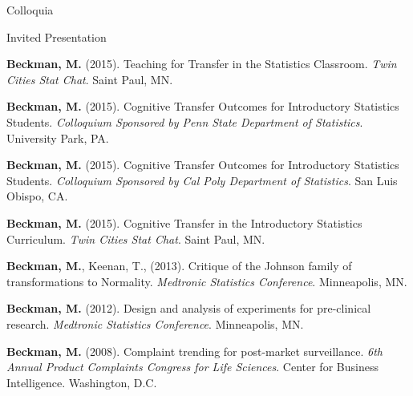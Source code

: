 \documentclass{resume} %
\begin{document}

\begin{rSection}{Colloquia}
	

	\begin{rSubsection}{Invited Presentation}{}{}{}
		
		\item[] \textbf{Beckman, M.} (2015). Teaching for Transfer in the Statistics Classroom. \textit{Twin Cities Stat Chat}. Saint Paul, MN. \vspace{0.5em}

		\item[] \textbf{Beckman, M.} (2015). Cognitive Transfer Outcomes for Introductory Statistics Students. \textit{Colloquium Sponsored by Penn State Department of Statistics}. University Park, PA. \vspace{0.5em}
		
		\item[] \textbf{Beckman, M.} (2015). Cognitive Transfer Outcomes for Introductory Statistics Students. \textit{Colloquium Sponsored by Cal Poly Department of Statistics}. San Luis Obispo, CA. \vspace{0.5em}		
		
		\item[] \textbf{Beckman, M.} (2015). Cognitive Transfer in the Introductory Statistics Curriculum. \textit{Twin Cities Stat Chat}. Saint Paul, MN. \vspace{0.5em}	

		\item[] \textbf{Beckman, M.}, Keenan, T., (2013). Critique of the Johnson family of transformations to Normality. \textit{Medtronic Statistics Conference}. Minneapolis, MN. \vspace{0.5em}
	
		\item[] \textbf{Beckman, M.} (2012). Design and analysis of experiments for pre-clinical research.  \textit{Medtronic Statistics Conference}. Minneapolis, MN. \vspace{0.5em}
		
		\item[] \textbf{Beckman, M.} (2008). Complaint trending for post-market surveillance. \textit{6th Annual Product Complaints Congress for Life Sciences}. Center for Business Intelligence. Washington, D.C. \vspace{0.5em}
		

\end{rSubsection}
\end{rSection}
\end{document}

